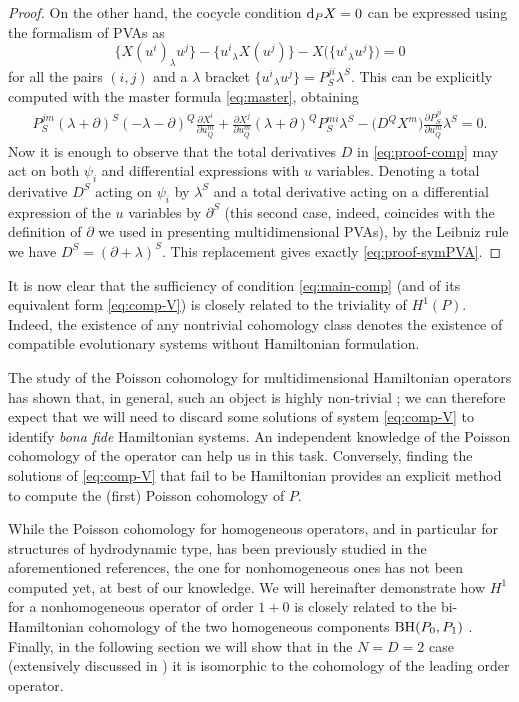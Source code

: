 \documentclass[10pt,a4paper]{amsart}
\numberwithin{equation}{section}
\begin{document}
\begin{proof}
On the other hand, the cocycle condition ${\rm d}_PX=0$ can be expressed using the formalism of PVAs \cite{casati2015deformations} as
\[%
\big\{X(u^i)_\lambda u^j\big\}-\big\{u^i{}_\lambda X(u^j)\big\}-X\big(\big\{u^i{}_\lambda u^j\big\}\big)=0
\]
for all the pairs $(i,j)$ and a $\lambda$ bracket $\{u^i{}_{\lambda}u^j\}=P^{ji}_S\lambda^S$. This can be explicitly computed with the master formula \eqref{eq:master}, obtaining
\begin{gather}\label{eq:proof-symPVA}
P^{jm}_S(\lambda+\partial)^S(-\lambda-\partial)^Q\frac{\partial X^i}{\partial u^m_Q}+\frac{\partial X^j}{\partial u^m_Q}(\lambda+\partial)^Q P^{mi}_S\lambda^S-\big(D^Q X^m\big)\frac{\partial P^{ji}_S}{\partial u^m_Q}\lambda^S=0.
\end{gather}
Now it is enough to observe that the total derivatives $D$ in \eqref{eq:proof-comp} may act on both $\psi_i$ and differential expressions with $u$ variables. Denoting a total derivative $D^S$ acting on $\psi_i$ by $\lambda^S$ and a total derivative acting on a differential expression of the $u$ variables by $\partial^S$ (this second case, indeed, coincides with the definition of $\partial$ we used in presenting multidimensional PVAs), by the Leibniz rule we have $D^S=(\partial+\lambda)^S$. This replacement gives exactly \eqref{eq:proof-symPVA}.
\end{proof}

It is now clear that the sufficiency of condition \eqref{eq:main-comp} (and of its equivalent form \eqref{eq:comp-V}) is closely related to the triviality of $H^1(P)$. Indeed, the existence of any nontrivial cohomology class denotes the existence of compatible evolutionary systems without Hamiltonian formulation.

The study of the Poisson cohomology for multidimensional Hamiltonian operators has shown that, in general, such an object is highly non-trivial \cite{ccs17,ccs18,casati2015deformations}; we can therefore expect that we will need to discard some solutions of system \eqref{eq:comp-V} to identify \emph{bona fide} Hamiltonian systems. An independent knowledge of the Poisson cohomology of the operator can help us in this task. Conversely, finding the solutions of \eqref{eq:comp-V} that fail to be Hamiltonian provides an explicit method to compute the (first) Poisson cohomology of $P$.

While the Poisson cohomology for homogeneous operators, and in particular for structures of hydrodynamic type, has been previously studied in the aforementioned references, the one for nonhomogeneous ones has not been computed yet, at best of our knowledge. We will hereinafter demonstrate how $H^1$ for a nonhomogeneous operator of order $1{+}0$ is closely related to the bi-Hamiltonian cohomology of the two homogeneous components ${\rm BH}(P_0,P_1)$ \cite{lz05}. Finally, in the following section we will show that in the $N=D=2$ case (extensively discussed in \cite{casati2015deformations}) it is isomorphic to the cohomology of the leading order operator.
\end{document}
